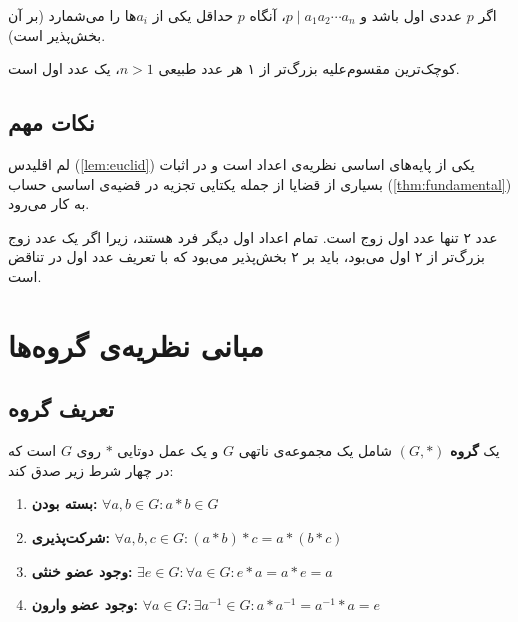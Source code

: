 \documentclass{matinbook}
\begin{document}
\begin{corollary}
    اگر $p$ عددی اول باشد و $p \mid a_{1}a_{2} \cdots a_{n}$،
    آنگاه $p$ حداقل یکی از $a_{i}$ها را می‌شمارد
    (بر آن بخش‌پذیر است).
    \label{cor:euclid-general}
\end{corollary}

\begin{proposition}
    کوچک‌ترین مقسوم‌علیه بزرگ‌تر از ۱ هر عدد طبیعی $n > 1$،
    یک عدد اول است.
    \label{prop:smallest-divisor}
\end{proposition}

\section{نکات مهم}
\label{sec:numbertheory-remarks}

\begin{remark}
    لم اقلیدس (\cref{lem:euclid}) یکی از پایه‌های اساسی
    نظریه‌ی اعداد است و در اثبات بسیاری از قضایا از جمله
    یکتایی تجزیه در قضیه‌ی اساسی حساب
    (\cref{thm:fundamental}) به کار می‌رود.
    \label{rem:euclid-importance}
\end{remark}

\begin{remark}
    عدد ۲ تنها عدد اول زوج است. تمام اعداد اول دیگر فرد
    هستند، زیرا اگر یک عدد زوج بزرگ‌تر از ۲ اول می‌بود،
    باید بر ۲ بخش‌پذیر می‌بود که با تعریف عدد اول در
    تناقض است.
    \label{rem:two-is-special}
\end{remark}

\chapter{مبانی نظریه‌ی گروه‌ها}
\label{chap:grouptheory}

\section{تعریف گروه}
\label{sec:grouptheory-definition}

\begin{definition}[گروه]
    یک \textbf{گروه} $(G, *)$ شامل یک مجموعه‌ی
    ناتهی $G$ و یک عمل دوتایی $*$ روی $G$ است که در چهار
    شرط زیر صدق کند:

    \begin{enumerate}
        \item \textbf{بسته بودن:}
        $\forall a, b \in G: a * b \in G$
        \item \textbf{شرکت‌پذیری:}
        $\forall a, b, c \in G: (a * b) * c = a * (b * c)$
        \item \textbf{وجود عضو خنثی:}
        $\exists e \in G: \forall a \in G: e * a = a * e = a$
        \item \textbf{وجود عضو وارون:}
        $\forall a \in G: \exists a^{-1} \in G:
        a * a^{-1} = a^{-1} * a = e$
    \end{enumerate}
    \label{def:group}
\end{definition}
\end{document}
